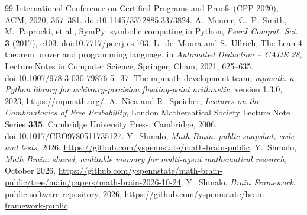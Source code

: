 \documentclass[11pt]{amsart}
\theoremstyle{definition}
\begin{document}
\begin{thebibliography}{99}
{International Conference on Certified Programs and Proofs (CPP 2020)}, ACM, 2020, 367--381.
\href{https://doi.org/10.1145/3372885.3373824}{doi:10.1145/3372885.3373824}.
 A.~Meurer, C.~P.~Smith, M.~Paprocki, et al., SymPy: symbolic computing in Python, \emph{PeerJ Comput.
Sci.} \textbf{3} (2017), e103. \href{https://doi.org/10.7717/peerj-cs.103}{doi:10.7717/peerj-cs.103}.
 L.~de~Moura and S.~Ullrich, The Lean 4 theorem prover and programming language, in \emph{Automated
Deduction -- CADE 28}, Lecture Notes in Computer Science, Springer, Cham, 2021, 625--635.
\href{https://doi.org/10.1007/978-3-030-79876-5_37}{doi:10.1007/978-3-030-79876-5\_37}.
 The mpmath development team, \emph{mpmath: a Python library for arbitrary-precision floating-point
arithmetic}, version 1.3.0, 2023, \url{https://mpmath.org/}.
 A.~Nica and R.~Speicher, \emph{Lectures on the Combinatorics of Free Probability}, London Mathematical
Society Lecture Note Series \textbf{335}, Cambridge University Press, Cambridge, 2006.
\href{https://doi.org/10.1017/CBO9780511735127}{doi:10.1017/CBO9780511735127}.
 Y.~Shmalo, \emph{Math Brain: public snapshot, code and tests}, 2026,
\url{https://github.com/yspennstate/math-brain-public}.
 Y.~Shmalo, \emph{Math Brain: shared, auditable memory for multi-agent mathematical research},
October 2026, \url{https://github.com/yspennstate/math-brain-public/tree/main/papers/math-brain-2026-10-24}.
 Y.~Shmalo, \emph{Brain Framework}, public software repository, 2026,
\url{https://github.com/yspennstate/brain-framework-public}.
\end{thebibliography}
\end{document}
